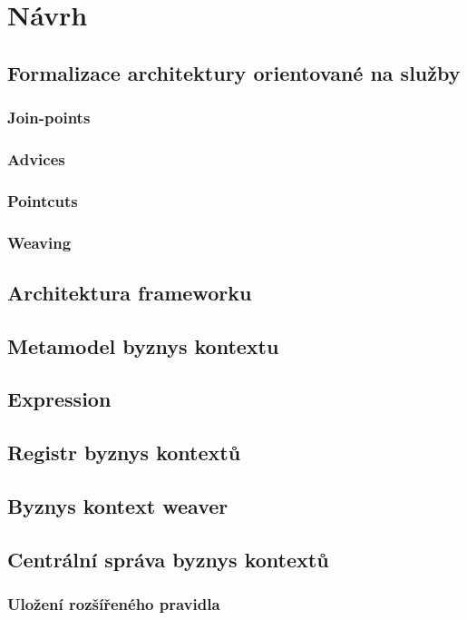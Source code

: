 \usepackage[T1]{fontenc}
\usepackage[utf8]{inputenc}


\chapter{Návrh}\label{ch:navrh}

\section{Formalizace architektury orientované na služby}

\subsection{Join-points}

\subsection{Advices}

\subsection{Pointcuts}

\subsection{Weaving}

\section{Architektura frameworku}

\section{Metamodel byznys kontextu}\label{sec:metamodel}

\section{Expression}

\section{Registr byznys kontextů}

\section{Byznys kontext weaver}

\section{Centrální správa byznys kontextů}

\subsection{Uložení rozšířeného pravidla}

